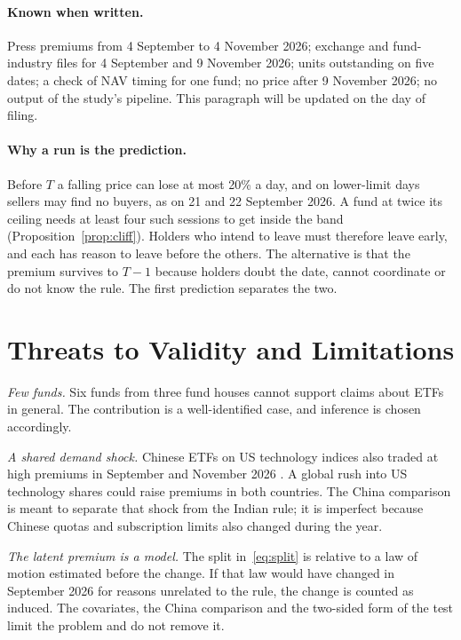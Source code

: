 \paragraph{Known when written.} Press premiums from 4 September to 4 November 2026; exchange and fund-industry files for 4 September and 9 November 2026; units outstanding on five dates; a check of NAV timing for one fund; no price after 9 November 2026; no output of the study's pipeline. This paragraph will be updated on the day of filing.

\paragraph{Why a run is the prediction.} Before $T$ a falling price can lose at most 20\% a day, and on lower-limit days sellers may find no buyers, as on 21 and 22 September 2026. A fund at twice its ceiling needs at least four such sessions to get inside the band (Proposition~\ref{prop:cliff}). Holders who intend to leave must therefore leave early, and each has reason to leave before the others. The alternative is that the premium survives to $T-1$ because holders doubt the date, cannot coordinate \citep{abreu2003bubbles} or do not know the rule. The first prediction separates the two.

\section{Threats to Validity and Limitations}\label{sec:limits}
\emph{Few funds.} Six funds from three fund houses cannot support claims about ETFs in general. The contribution is a well-identified case, and inference is chosen accordingly.

\emph{A shared demand shock.} Chinese ETFs on US technology indices also traded at high premiums in September and November 2026 \citep{caixin2026nov}. A global rush into US technology shares could raise premiums in both countries. The China comparison is meant to separate that shock from the Indian rule; it is imperfect because Chinese quotas and subscription limits also changed during the year.

\emph{The latent premium is a model.} The split in~\eqref{eq:split} is relative to a law of motion estimated before the change. If that law would have changed in September 2026 for reasons unrelated to the rule, the change is counted as induced. The covariates, the China comparison and the two-sided form of the test limit the problem and do not remove it.

